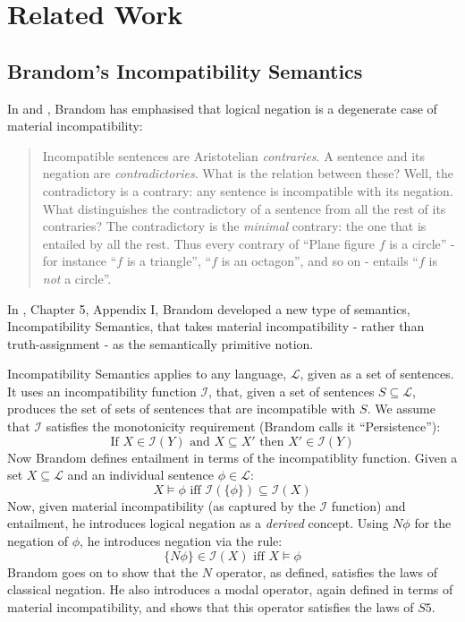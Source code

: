 \section{Related Work}

\subsection{Brandom's Incompatibility Semantics}
In \cite{brandom2} and \cite{brandom}, Brandom has emphasised that logical negation is a degenerate case of material incompatibility:
\begin{quote}
Incompatible sentences are Aristotelian \emph{contraries}. A sentence and its negation are \emph{contradictories}. What is the relation between these? Well, the contradictory is a contrary: any sentence is incompatible with its negation. What distinguishes the contradictory of a sentence  from all the rest of its contraries? The contradictory is the \emph{minimal} contrary: the one that is entailed by all the rest. Thus every contrary of ``Plane figure $f$ is a circle'' - for instance ``$f$ is a triangle'', ``$f$ is an octagon'', and so on - entails ``$f$ is \emph{not} a circle''.
\end{quote}
In \cite{brandom}, Chapter 5, Appendix I, Brandom developed a new type of semantics, Incompatibility Semantics, that takes material incompatibility - rather than truth-assignment - as the semantically primitive notion.

Incompatibility Semantics applies to any language, $\mathcal{L}$, given as a set of sentences. 
It uses an incompatibility function $\mathcal{I}$, that, given a set of sentences $S \subseteq \mathcal{L}$, produces the set of sets of sentences that are incompatible with $S$.
We assume that $\mathcal{I}$ satisfies the monotonicity requirement (Brandom calls it ``Persistence''):
\[
\text{If } X \in \mathcal{I}(Y) \text{ and } X \subseteq X' \text{ then } X' \in \mathcal{I}(Y)
\]
Now Brandom defines entailment in terms of the incompatiblity function. Given a set $X \subseteq \mathcal{L}$ and an individual sentence $\phi \in \mathcal{L}$:
\[
X \models \phi \text{ iff } \mathcal{I}(\{\phi\}) \subseteq \mathcal{I}(X)
\]
Now, given material incompatibility (as captured by the $\mathcal{I}$ function) and entailment, he introduces logical negation as a \emph{derived} concept. Using $N \phi$ for the negation of $\phi$, he introduces negation via the rule:
\[
\{N \phi\} \in \mathcal{I}(X) \text{ iff } X \models \phi
\]
Brandom goes on to show that the $N$ operator, as defined, satisfies the laws of classical negation. 
He also introduces a modal operator, again defined in terms of material incompatibility, and shows that this operator satisfies the laws of $S5$.

